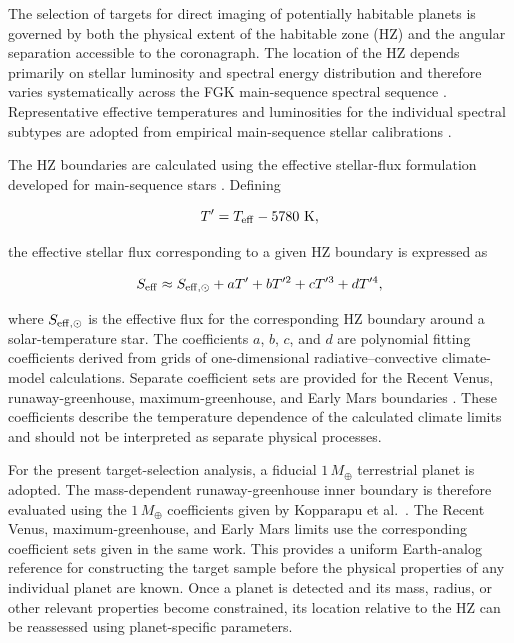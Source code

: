 The selection of targets for direct imaging of potentially habitable planets is
governed by both the physical extent of the habitable zone (HZ) and the angular
separation accessible to the coronagraph. The location of the HZ depends primarily
on stellar luminosity and spectral energy distribution and therefore varies
systematically across the FGK main-sequence spectral sequence
\cite{kopparapu13,kopparapu14}. Representative effective temperatures and
luminosities for the individual spectral subtypes are adopted from empirical
main-sequence stellar calibrations \cite{pecaut13}.

The HZ boundaries are calculated using the effective stellar-flux formulation
developed for main-sequence stars \cite{kopparapu13,kopparapu14}. Defining

\begin{equation}
T' = T_{\rm eff} - 5780~{\rm K},
\label{eq:hz-temperature}
\end{equation}

\noindent
the effective stellar flux corresponding to a given HZ boundary is expressed as

\begin{equation}
S_{\rm eff}
\approx
S_{\rm eff,\odot}
+aT'
+bT'^2
+cT'^3
+dT'^4 ,
\label{eq:seff}
\end{equation}

\noindent
where $S_{\rm eff,\odot}$ is the effective flux for the corresponding HZ boundary
around a solar-temperature star. The coefficients $a$, $b$, $c$, and $d$ are
polynomial fitting coefficients derived from grids of one-dimensional
radiative--convective climate-model calculations. Separate coefficient sets are
provided for the Recent Venus, runaway-greenhouse, maximum-greenhouse, and
Early Mars boundaries \cite{kopparapu13,kopparapu14}. These coefficients
describe the temperature dependence of the calculated climate limits and should
not be interpreted as separate physical processes.

For the present target-selection analysis, a fiducial $1\,M_{\oplus}$ terrestrial
planet is adopted. The mass-dependent runaway-greenhouse inner boundary is
therefore evaluated using the $1\,M_{\oplus}$ coefficients given by
Kopparapu et al.~\cite{kopparapu14}. The Recent Venus, maximum-greenhouse,
and Early Mars limits use the corresponding coefficient sets given in the same
work. This provides a uniform Earth-analog reference for constructing the target
sample before the physical properties of any individual planet are known. Once
a planet is detected and its mass, radius, or other relevant properties become
constrained, its location relative to the HZ can be reassessed using
planet-specific parameters.

